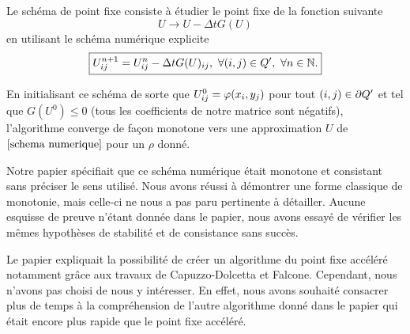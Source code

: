 Le schéma de point fixe consiste à étudier le point fixe de la fonction suivante 
\begin{equation*}
    U \rightarrow U - \Delta tG(U)
\end{equation*}
en utilisant le schéma numérique explicite 
\begin{equation}
    \boxed{U^{n+1}_{ij} = U_{ij}^n - \Delta tG(U)_{ij}, \ \forall (i,j)\in Q', \ \forall n\in\mathbb{N}.} \label{pt_fixe}
\end{equation}

En initialisant ce schéma de sorte que $U_{ij}^0=\varphi(x_i,y_j)$ pour tout $(i,j)\in \mathop{}\!{\partial} Q'$ et tel que $G(U^0)\leq 0$ (tous les coefficients de notre matrice sont négatifs), l'algorithme converge de façon monotone vers une approximation $U$ de $\eqref{schema numerique}$ pour un $\rho$ donné. 

\begin{noremark}
    Notre papier spécifiait que ce schéma numérique était monotone et consistant sans préciser le sens utilisé. Nous avons réussi à démontrer une forme classique de monotonie, mais celle-ci ne nous a pas paru pertinente à détailler. Aucune esquisse de preuve n'étant donnée dans le papier, nous avons essayé de vérifier les mêmes hypothèses de stabilité et de consistance sans succès.
\end{noremark}
\begin{noremark}
    Le papier expliquait la possibilité de créer un algorithme du point fixe accéléré notamment grâce aux travaux de Capuzzo-Dolcetta et Falcone. Cependant, nous n'avons pas choisi de nous y intéresser. En effet, nous avons souhaité consacrer plus de temps à la compréhension de l'autre algorithme donné dans le papier qui était encore plus rapide que le point fixe accéléré.
\end{noremark}


